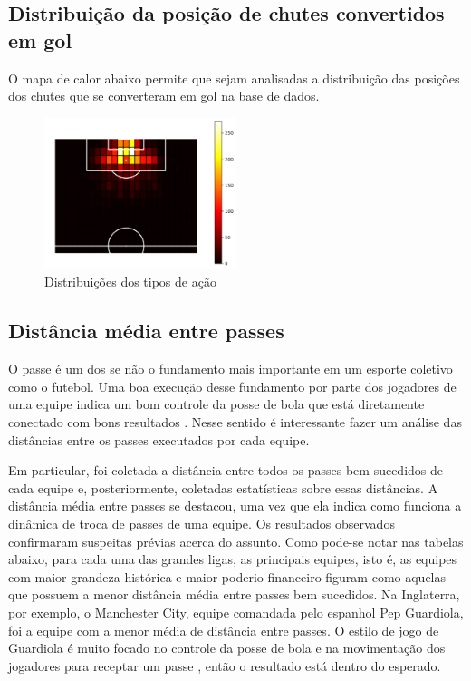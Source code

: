\documentclass{article}
\begin{document}
\subsection{Distribuição da posição de chutes convertidos em gol}

O mapa de calor abaixo permite que sejam analisadas a distribuição das posições dos chutes que se converteram em gol
na base de dados.

\begin{figure}[H]
    \centering
    \includegraphics[width=0.5\textwidth]{images/goal_position_heatmap.png}
    \caption{Distribuições dos tipos de ação}
    \label{fig:heatmap_goals}
\end{figure}

\subsection{Distância média entre passes}

O passe é um dos se não o fundamento mais importante em um esporte coletivo
como o futebol. Uma boa execução desse fundamento por parte dos jogadores
de uma equipe indica um bom controle da posse de bola que está diretamente
conectado com bons resultados \cite{cox2022linhas}. Nesse sentido é
interessante fazer um análise
das distâncias entre os passes
executados por cada equipe.

Em particular, foi coletada a distância entre todos os passes bem sucedidos de
cada equipe e, posteriormente, coletadas estatísticas sobre essas distâncias. A
distância média
entre passes se destacou, uma vez que ela indica como funciona a dinâmica de
troca de passes de uma equipe. Os resultados observados confirmaram suspeitas
prévias acerca do assunto.
Como pode-se notar nas tabelas abaixo, para cada uma das grandes ligas, as
principais equipes, isto é, as equipes com maior grandeza histórica e maior
poderio financeiro figuram como aquelas
que possuem a menor distância média entre passes bem sucedidos. Na Inglaterra,
por exemplo, o Manchester City, equipe comandada pelo espanhol Pep Guardiola,
foi a equipe com a menor média
de distância entre passes. O estilo de jogo de Guardiola é muito focado no
controle da posse de bola e na movimentação dos jogadores para receptar um
passe \cite{terzis2023pep}, então o resultado está dentro do
esperado.
\end{document}
